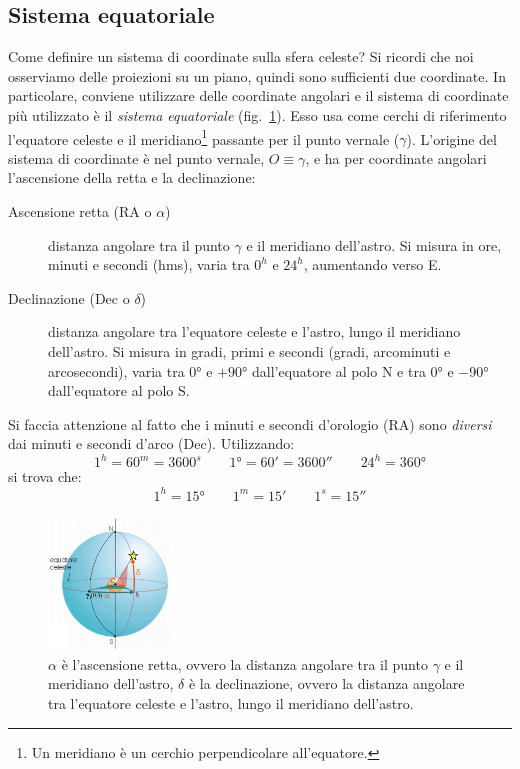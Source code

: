 \subsection{Sistema equatoriale}
Come definire un sistema di coordinate sulla sfera celeste? Si ricordi che noi osserviamo delle proiezioni su un piano, quindi sono sufficienti due coordinate. In particolare, conviene utilizzare delle coordinate angolari e il sistema di coordinate più utilizzato è il \emph{sistema equatoriale} (fig.~\ref{fig:sistema-equatoriale}). Esso usa come cerchi di riferimento l'equatore celeste e il meridiano\footnote{Un meridiano è un cerchio perpendicolare all'equatore.} passante per il punto vernale ($\gamma$). L'origine del sistema di coordinate è nel punto vernale, $O \equiv \gamma$, e ha per coordinate angolari l'ascensione della retta e la declinazione:
\begin{description}
    \item[Ascensione retta (RA o $\alpha$)] distanza angolare tra il punto $\gamma$ e il meridiano dell'astro. Si misura in ore, minuti e secondi (hms), varia tra $0^h$ e $24^h$, aumentando verso E.
    \item[Declinazione (Dec o $\delta$)] distanza angolare tra l'equatore celeste e l'astro, lungo il meridiano dell'astro. Si misura in gradi, primi e secondi (gradi, arcominuti e arcosecondi), varia tra $\ang{0}$ e $+\ang{90}$ dall'equatore al polo N e tra $\ang{0}$ e $-\ang{90}$ dall'equatore al polo S.
\end{description}
Si faccia attenzione al fatto che i minuti e secondi d'orologio (RA) sono \emph{diversi} dai minuti e secondi d'arco (Dec). Utilizzando:
\[
    1^h = 60^m = 3600^s \qquad \ang{1} = 60' = 3600'' \qquad 24^h = \ang{360}
\]
si trova che:
\[
    1^h = \ang{15} \qquad 1^m = 15' \qquad 1^s = 15''
\]

\begin{figure}
\centering
\includegraphics[width=0.3\textwidth]{immagini/sistema-equatoriale.png}
\caption{$\alpha$ è l'ascensione retta, ovvero la distanza angolare tra il punto $\gamma$ e il meridiano dell'astro, $\delta$ è la declinazione, ovvero la distanza angolare tra l'equatore celeste e l'astro, lungo il meridiano dell'astro.}
\label{fig:sistema-equatoriale}
\end{figure}

